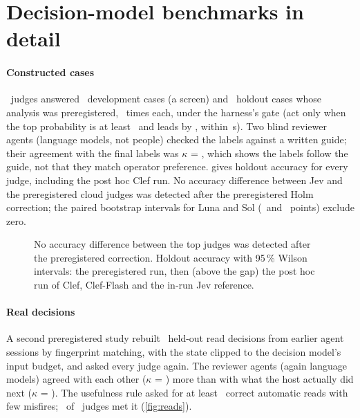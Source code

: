 \section{Decision-model benchmarks in detail}\label{sec:judges}

\paragraph{Constructed cases} \NumBase\ judges answered \DevN\ development cases (a screen) and \HoldN\ holdout cases
whose analysis was preregistered, \HoldReps\ times each, under the harness's gate (act only when the top probability
is at least \MinP\ and leads by \MinMargin, within \TimeoutS\,s). Two blind reviewer agents (language models, not people) checked the labels
against a written guide; their agreement with the final labels was $\kappa$ = \KappaHoldAB, which shows the labels
follow the guide, not that they match operator preference.  gives holdout
accuracy for every judge, including the post hoc Clef run. No accuracy difference between Jev and the preregistered
cloud judges was detected after the preregistered Holm correction; the paired bootstrap intervals for Luna and Sol
(\LunaHoldRAccDiffCI\ and \SolHoldRAccDiffCI\ points) exclude zero.

\begin{figure}[tbp]
\centering
{}\par\smallskip

\caption{No accuracy difference between the top judges was detected after the preregistered correction. Holdout accuracy with 95\,\% Wilson intervals: the preregistered run, then (above the gap) the post hoc run
of Clef, Clef-Flash and the in-run Jev reference.}
\label{fig:accuracy}
\end{figure}

\paragraph{Real decisions} A second preregistered study rebuilt \TrN\ held-out read decisions from earlier agent
sessions by fingerprint matching, with the state clipped to the decision model's input budget, and asked every judge
again. The reviewer agents (again language models) agreed with each other ($\kappa$ = \TrKappaAB) more than with what
the host actually did next ($\kappa$ = \TrKappaOutcome). The usefulness rule asked for at least \TrUsefulMinReads\ correct automatic reads
with few misfires; \TrNUseful\ of \NumBase\ judges met it (\cref{fig:reads}).

